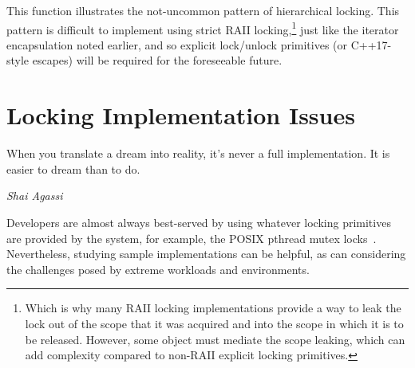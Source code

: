 
This function illustrates the not-uncommon pattern of hierarchical
locking.
This pattern is difficult to implement using strict RAII locking,\footnote{
	Which is why many RAII locking implementations provide a way
	to leak the lock out of the scope that it was acquired and into
	the scope in which it is to be released.
	However, some object must mediate the scope leaking, which can
	add complexity compared to non-RAII explicit locking primitives.}
just like the iterator encapsulation noted earlier, and so explicit
lock/unlock primitives (or C++17-style  escapes) will
be required for the foreseeable future.

\section{Locking Implementation Issues}
\label{sec:locking:Locking Implementation Issues}
%
\epigraph{When you translate a dream into reality, it's never a full
	  implementation.  It is easier to dream than to do.}
	 {\emph{Shai Agassi}}

Developers are almost always best-served by using whatever locking
primitives are provided by the system, for example, the POSIX
pthread mutex locks~\cite{OpenGroup1997pthreads,Butenhof1997pthreads}.
Nevertheless, studying sample implementations can be helpful,
as can considering the challenges posed by extreme workloads and
environments.

